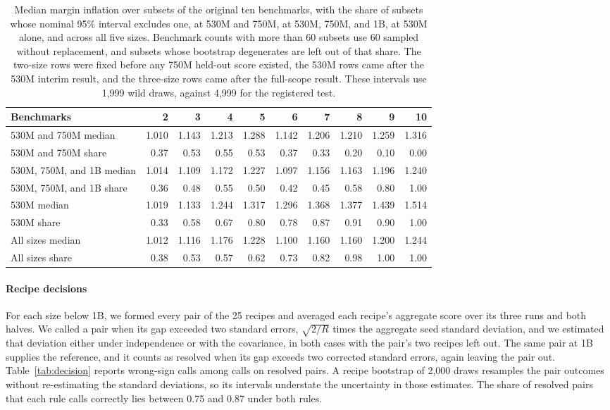 \begin{table}[!htb]
\centering
\caption{Median margin inflation over subsets of the original ten benchmarks, with the share of subsets whose nominal 95\% interval excludes one, at 530M and 750M, at 530M, 750M, and 1B, at 530M alone, and across all five sizes. Benchmark counts with more than 60 subsets use 60 sampled without replacement, and subsets whose bootstrap degenerates are left out of that share. The two-size rows were fixed before any 750M held-out score existed, the 530M rows came after the 530M interim result, and the three-size rows came after the full-scope result. These intervals use 1,999 wild draws, against 4,999 for the registered test.}
\label{tab:battery}
\small\setlength{\tabcolsep}{4pt}\renewcommand{\arraystretch}{1.12}
\begin{tabular}{lrrrrrrrrr}
\toprule
Benchmarks & 2 & 3 & 4 & 5 & 6 & 7 & 8 & 9 & 10\\
\midrule
530M and 750M median & 1.010 & 1.143 & 1.213 & 1.288 & 1.142 & 1.206 & 1.210 & 1.259 & 1.316\\
530M and 750M share & 0.37 & 0.53 & 0.55 & 0.53 & 0.37 & 0.33 & 0.20 & 0.10 & 0.00\\
530M, 750M, and 1B median & 1.014 & 1.109 & 1.172 & 1.227 & 1.097 & 1.156 & 1.163 & 1.196 & 1.240\\
530M, 750M, and 1B share & 0.36 & 0.48 & 0.55 & 0.50 & 0.42 & 0.45 & 0.58 & 0.80 & 1.00\\
530M median & 1.019 & 1.133 & 1.244 & 1.317 & 1.296 & 1.368 & 1.377 & 1.439 & 1.514\\
530M share & 0.33 & 0.58 & 0.67 & 0.80 & 0.78 & 0.87 & 0.91 & 0.90 & 1.00\\
All sizes median & 1.012 & 1.116 & 1.176 & 1.228 & 1.100 & 1.160 & 1.160 & 1.200 & 1.244\\
All sizes share & 0.38 & 0.53 & 0.57 & 0.62 & 0.73 & 0.82 & 0.98 & 1.00 & 1.00\\
\bottomrule
\end{tabular}
\end{table}
\paragraph{Recipe decisions}\label{app:decision}
For each size below 1B, we formed every pair of the 25 recipes and averaged each recipe's aggregate score over its three runs and both halves. We called a pair when its gap exceeded two standard errors, $\sqrt{2/R}$ times the aggregate seed standard deviation, and we estimated that deviation either under independence or with the covariance, in both cases with the pair's two recipes left out. The same pair at 1B supplies the reference, and it counts as resolved when its gap exceeds two corrected standard errors, again leaving the pair out. Table~\ref{tab:decision} reports wrong-sign calls among calls on resolved pairs. A recipe bootstrap of 2,000 draws resamples the pair outcomes without re-estimating the standard deviations, so its intervals understate the uncertainty in those estimates. The share of resolved pairs that each rule calls correctly lies between 0.75 and 0.87 under both rules.


